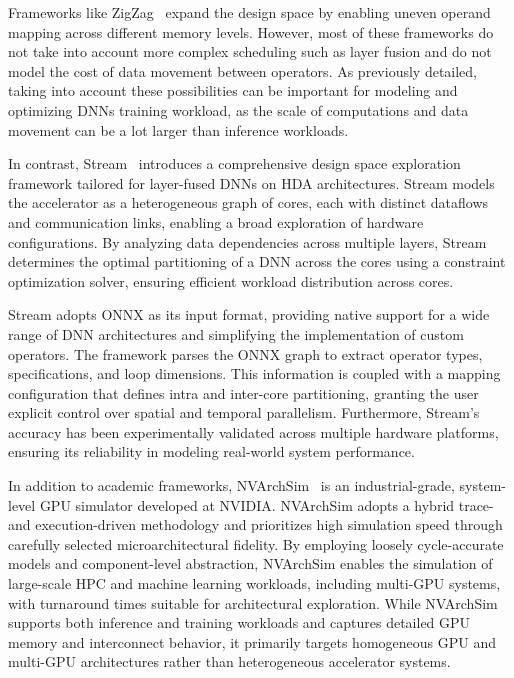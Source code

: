 \documentclass[lettersize,journal]{IEEEtran}
\begin{document}
Frameworks like ZigZag~\cite{mei2021ZigZag} expand the design space by enabling uneven operand mapping across different memory levels. However, most of these frameworks do not take into account more complex scheduling such as layer fusion and do not model the cost of data movement between operators. As previously detailed, taking into account these possibilities can be important for modeling and optimizing DNNs training workload, as the scale of computations and data movement can be a lot larger than inference workloads.

In contrast, Stream~\cite{symons2024stream} introduces a comprehensive design space exploration framework tailored for layer-fused DNNs on HDA architectures. Stream models the accelerator as a heterogeneous graph of cores, each with distinct dataflows and communication links, enabling a broad exploration of hardware configurations. By analyzing data dependencies across multiple layers, Stream determines the optimal partitioning of a DNN across the cores using a constraint optimization solver, ensuring efficient workload distribution across cores.

Stream adopts ONNX as its input format, providing native support for a wide range of DNN architectures and simplifying the implementation of custom operators. The framework parses the ONNX graph to extract operator types, specifications, and loop dimensions. This information is coupled with a mapping configuration that defines intra and inter-core partitioning, granting the user explicit control over spatial and temporal parallelism. Furthermore, Stream’s accuracy has been experimentally validated across multiple hardware platforms, ensuring its reliability in modeling real-world system performance.

In addition to academic frameworks, NVArchSim~\cite{nvarchsim} is an industrial-grade, system-level GPU simulator developed at NVIDIA. NVArchSim adopts a hybrid trace- and execution-driven methodology and prioritizes high simulation speed through carefully selected microarchitectural fidelity. By employing loosely cycle-accurate models and component-level abstraction, NVArchSim enables the simulation of large-scale HPC and machine learning workloads, including multi-GPU systems, with turnaround times suitable for architectural exploration. While NVArchSim supports both inference and training workloads and captures detailed GPU memory and interconnect behavior, it primarily targets homogeneous GPU and multi-GPU architectures rather than heterogeneous accelerator systems.
\end{document}
